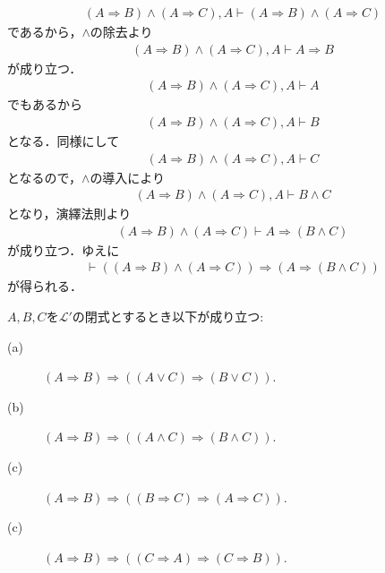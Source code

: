 	\begin{prf}
		\begin{align}
			(A \Longrightarrow B) \wedge (A \Longrightarrow C),A \vdash
			(A \Longrightarrow B) \wedge (A \Longrightarrow C)
		\end{align}
		であるから，$\wedge$の除去より
		\begin{align}
			(A \Longrightarrow B) \wedge (A \Longrightarrow C),A \vdash
			A \Longrightarrow B
		\end{align}
		が成り立つ．
		\begin{align}
			(A \Longrightarrow B) \wedge (A \Longrightarrow C),A \vdash A
		\end{align}
		でもあるから
		\begin{align}
			(A \Longrightarrow B) \wedge (A \Longrightarrow C),A \vdash B
		\end{align}
		となる．同様にして
		\begin{align}
			(A \Longrightarrow B) \wedge (A \Longrightarrow C),A \vdash C
		\end{align}
		となるので，$\wedge$の導入により
		\begin{align}
			(A \Longrightarrow B) \wedge (A \Longrightarrow C),A \vdash B \wedge C
		\end{align}
		となり，演繹法則より
		\begin{align}
			(A \Longrightarrow B) \wedge (A \Longrightarrow C) \vdash
			A \Longrightarrow (B \wedge C)
		\end{align}
		が成り立つ．ゆえに
		\begin{align}
			\vdash ((A \Longrightarrow B) \wedge (A \Longrightarrow C))
			\Longrightarrow (A \Longrightarrow (B \wedge C))
		\end{align}
		が得られる．
		\QED
	\end{prf}
	
	\begin{screen}
		\begin{logicalthm}[含意は遺伝する]\label{logicalthm:rule_of_inference_1}
			$A,B,C$を$\mathcal{L}'$の閉式とするとき以下が成り立つ:
			\begin{description}
				\item[(a)] $(A \Longrightarrow B) \Longrightarrow ( (A \vee C) \Longrightarrow (B \vee C) )$.
				
				\item[(b)] $(A \Longrightarrow B) \Longrightarrow ( (A \wedge C) \Longrightarrow (B \wedge C) )$.
				
				\item[(c)] $(A \Longrightarrow B) \Longrightarrow ( (B \Longrightarrow C) \Longrightarrow (A \Longrightarrow C) )$.
				
				\item[(c)] $(A \Longrightarrow B) \Longrightarrow ( (C \Longrightarrow A) \Longrightarrow (C \Longrightarrow B) )$.
			\end{description}
		\end{logicalthm}
	\end{screen}
	
